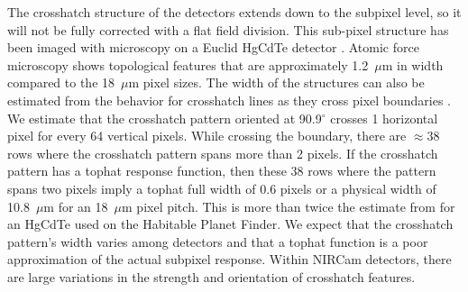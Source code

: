 \documentclass{aastex62}
\newcommand{\degree}{^\circ}
\begin{document}
The crosshatch structure of the detectors extends down to the subpixel level, so it will not be fully corrected with a flat field division.
This sub-pixel structure has been imaged with microscopy on a Euclid HgCdTe detector \citep{shapiro2018crosshatch}.
Atomic force microscopy shows topological features that are approximately 1.2~$\mu$m in width \citep{chang2008surfaceMorphologyHgCdTe} compared to the 18~$\mu$m pixel sizes.
The width of the structures can also be estimated from the behavior for crosshatch lines as they cross pixel boundaries \citep{ninan2019crosshatchHPF}.
We estimate that the crosshatch pattern oriented at 90.9$\degree$ crosses 1 horizontal pixel for every 64 vertical pixels.
While crossing the boundary, there are $\approx 38$ rows where the crosshatch pattern spans more than 2 pixels.
If the crosshatch pattern has a tophat response function, then these 38 rows where the pattern spans two pixels imply a tophat full width of 0.6 pixels or a physical width of 10.8~$\mu$m for an 18~$\mu$m pixel pitch.
This is more than twice the estimate from \citet{ninan2019crosshatchHPF} for an HgCdTe used on the Habitable Planet Finder.
We expect that the crosshatch pattern's width varies among detectors and that a tophat function is a poor approximation of the actual subpixel response.
Within NIRCam detectors, there are large variations in the strength and orientation of crosshatch features.
\end{document}
